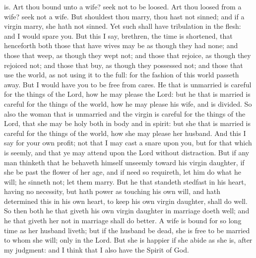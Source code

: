 is. Art thou bound unto a wife? seek not to be loosed. Art thou loosed from a wife? seek not a wife. But shouldest thou marry, thou hast not sinned; and if a virgin marry, she hath not sinned. Yet such shall have tribulation in the flesh: and I would spare you. But this I say, brethren, the time is shortened, that henceforth both those that have wives may be as though they had none; and those that weep, as though they wept not; and those that rejoice, as though they rejoiced not; and those that buy, as though they possessed not; and those that use the world, as not using it to the full: for the fashion of this world passeth away. But I would have you to be free from cares. He that is unmarried is careful for the things of the Lord, how he may please the Lord: but he that is married is careful for the things of the world, how he may please his wife, and is divided. So also the woman that is unmarried and the virgin is careful for the things of the Lord, that she may be holy both in body and in spirit: but she that is married is careful for the things of the world, how she may please her husband. And this I say for your own profit; not that I may cast a snare upon you, but for that which is seemly, and that ye may attend upon the Lord without distraction. But if any man thinketh that he behaveth himself unseemly toward his virgin daughter, if she be past the flower of her age, and if need so requireth, let him do what he will; he sinneth not; let them marry. But he that standeth stedfast in his heart, having no necessity, but hath power as touching his own will, and hath determined this in his own heart, to keep his own virgin daughter, shall do well. So then both he that giveth his own virgin daughter in marriage doeth well; and he that giveth her not in marriage shall do better. A wife is bound for so long time as her husband liveth; but if the husband be dead, she is free to be married to whom she will; only in the Lord. But she is happier if she abide as she is, after my judgment: and I think that I also have the Spirit of God. 

